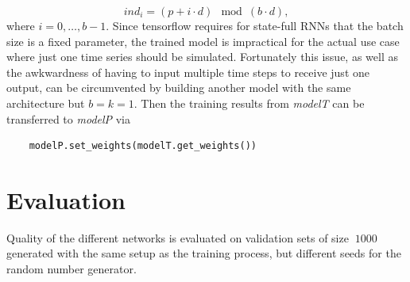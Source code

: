 \documentclass[sigconf]{acmart}
\begin{document}
\[
ind_i = (p + i \cdot d) \mod (b \cdot d),
\]
where $i=0,\dots,b-1$.
Since tensorflow requires for state-full RNNs that the batch size is a fixed parameter, the trained model is impractical for the actual use case where just one time series should be simulated. Fortunately this issue, as well as the awkwardness of having to input multiple time steps to receive just one output, can be circumvented by building another model with the same architecture but $b=k=1$. Then the training results from \textit{modelT} can be transferred to \textit{modelP} via 
\begin{verbatim}
	modelP.set_weights(modelT.get_weights())
\end{verbatim}
\section{Evaluation}
Quality of the different networks is evaluated on validation sets of size $~1000$ generated with the same setup as the training process, but different seeds for the random number generator.
\end{document}
